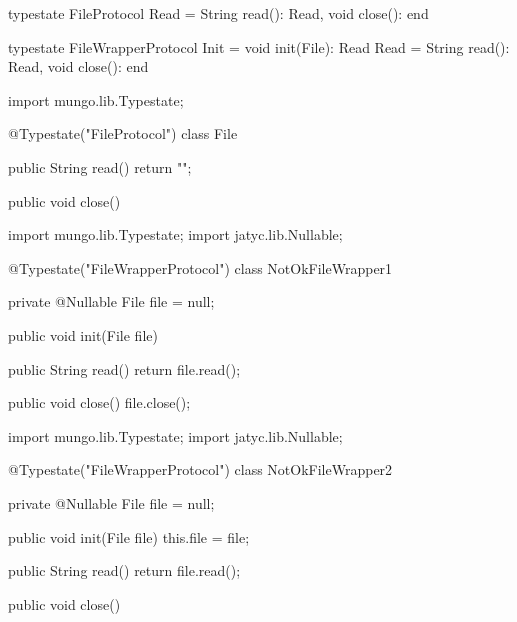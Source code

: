 \begin{code}
typestate FileProtocol {
  Read = {
    String read(): Read,
    void close(): end
  }
}\end{code}

\begin{code}
typestate FileWrapperProtocol {
  Init = {
    void init(File): Read
  }
  Read = {
    String read(): Read,
    void close(): end
  }
}\end{code}

\begin{code}
import mungo.lib.Typestate;

@Typestate("FileProtocol")
class File {

  public String read() {
    return "";
  }

  public void close() {
  }

}\end{code}

\begin{code}
import mungo.lib.Typestate;
import jatyc.lib.Nullable;

@Typestate("FileWrapperProtocol")
class NotOkFileWrapper1 {

  private @Nullable File file = null;

  public void init(File file) {}

  public String read() {
    return file.read();
  }

  public void close() {
    file.close();
  }

}\end{code}

\begin{code}
import mungo.lib.Typestate;
import jatyc.lib.Nullable;

@Typestate("FileWrapperProtocol")
class NotOkFileWrapper2 {

  private @Nullable File file = null;

  public void init(File file) {
    this.file = file;
  }

  public String read() {
    return file.read();
  }

  public void close() {

  }

}\end{code}

